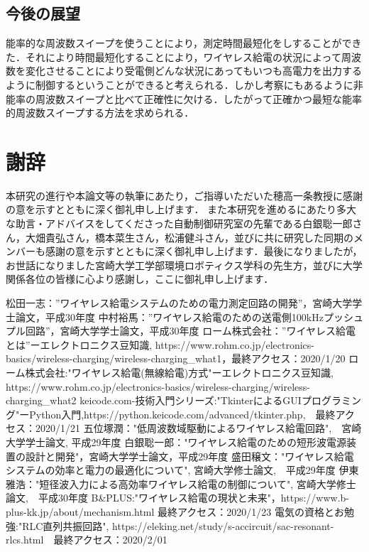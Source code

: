\documentclass[12pt]{jarticle}
\begin{document}
\subsection{今後の展望}
能率的な周波数スイープを使うことにより，測定時間最短化をしすることができた．それにより時間最短化することにより，ワイヤレス給電の状況によって周波数を変化させることにより受電側どんな状況にあってもいつも高電力を出力するように制御するということができると考えられる．しかし考察にもあるように非能率の周波数スイープと比べて正確性に欠ける．したがって正確かつ最短な能率的周波数スイープする方法を求められる．
\clearpage
\section{謝辞}
 本研究の進行や本論文等の執筆にあたり，ご指導いただいた穂高一条教授に感謝の意を示すとともに深く御礼申し上げます．
また本研究を進めるにあたり多大な助言・アドバイスをしてくださった自動制御研究室の先輩である白銀聡一郎さん，大畑貴弘さん，橋本菜生さん，松浦健斗さん，並びに共に研究した同期のメンバーも感謝の意を示すとともに深く御礼申し上げます．最後になりましたが，お世話になりました宮崎大学工学部環境ロボティクス学科の先生方，並びに大学関係各位の皆様に心より感謝し，ここに御礼申し上げます．

\begin{thebibliography}{50}
	松田一志：”ワイヤレス給電システムのための電力測定回路の開発”，宮崎大学学士論文，平成30年度
	中村裕馬：”ワイヤレス給電のための送電側100kHzプッシュプル回路”，宮崎大学学士論文，平成30年度
	ローム株式会社：”ワイヤレス給電とは”ーエレクトロニクス豆知識, https://www.rohm.co.jp/electronics-basics/wireless-charging/wireless-charging\_what1，最終アクセス：2020/1/20
	ローム株式会社:"ワイヤレス給電(無線給電)方式"ーエレクトロニクス豆知識, https://www.rohm.co.jp/electronics-basics/wireless-charging/wireless-charging\_what2
	keicode.com-技術入門シリーズ:"TkinterによるGUIプログラミング"ーPython入門,https://python.keicode.com/advanced/tkinter.php,　最終アクセス：2020/1/21
	五位塚潤："低周波数域駆動によるワイヤレス給電回路",　宮崎大学学士論文, 平成29年度
	白銀聡一郎："ワイヤレス給電のための短形波電源装置の設計と開発"，宮崎大学学士論文，平成29年度
	盛田穣文："ワイヤレス給電システムの効率と電力の最適化について", 宮崎大学修士論文,　平成29年度
	伊東雅浩："短径波入力による高効率ワイヤレス給電の制御について", 宮崎大学修士論文,　平成30年度
	B\&PLUS:"ワイヤレス給電の現状と未来"，https://www.b-plus-kk.jp/about/mechanism.html 最終アクセス：2020/1/23
	電気の資格とお勉強:"RLC直列共振回路", https://eleking.net/study/s-accircuit/sac-resonant-rlcs.html　最終アクセス：2020/2/01
\end{thebibliography}
\clearpage
\end{document}

